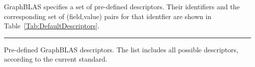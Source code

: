 GraphBLAS specifies a set of pre-defined descriptors. Their identifiers
and the corresponding set of (field,value) pairs for that
identfier are shown in Table~\ref{Tab:DefaultDescriptors}.

\newcommand{\grboutp}{{\sf GrB\_OUTP}}
\newcommand{\grbmask}{{\sf GrB\_MASK}}
\newcommand{\grbinp}[1]{{\sf GrB\_INP#1}}
\newcommand{\grbreplace}{{\sf GrB\_REPLACE}}
\newcommand{\grbstructure}{{\sf GrB\_STRUCTURE}}
\newcommand{\grbscmp}{{\sf GrB\_COMP}}
\newcommand{\grbtran}{{\sf GrB\_TRAN}}

\begin{table}[htbp]
    \hrule
    \begin{center}
	\caption{Pre-defined GraphBLAS descriptors. The list includes
	all possible descriptors, according to the current standard.}
	\label{Tab:DefaultDescriptors}


\end{center}
\end{table}
